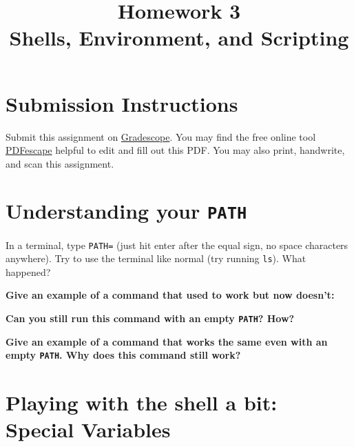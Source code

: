 \documentclass{article}
\begin{document}
\fancyhead[L]{}
\fancyhead[R]{}

\fancyfoot[C]{\thepage~/~\pageref*{LastPage}}
\pagestyle{fancyplain}


\title{\textbf{Homework 3\\Shells, Environment, and Scripting}}
\author{\textbf{\color{red}{Due: Saturday, January 28, 10:00PM (Hard Deadline)}}}
\date{}
\maketitle

\section*{Submission Instructions}
Submit this assignment on \href{https://gradescope.com/courses/5574}{Gradescope}.
You may find the free online tool \href{https://www.pdfescape.com}{PDFescape}
helpful to edit and fill out this PDF.
You may also print, handwrite, and scan this assignment.


\section{Understanding your \texttt{PATH}}

In a terminal, type \texttt{PATH=} (just hit enter after the equal sign, no
space characters anywhere). Try to use the terminal like normal (try running
\texttt{ls}). What happened?

\textbf{Give an example of a command that used to work but now doesn't:}
\vspace{1.5cm}

\textbf{Can you still run this command with an empty \texttt{PATH}? How?}
\vspace{1.5cm}

\textbf{Give an example of a command that works the same even with an empty
\texttt{PATH}. Why does this command still work?}
\vspace{1.5cm}


\section{Playing with the shell a bit: Special Variables}
\end{document}
